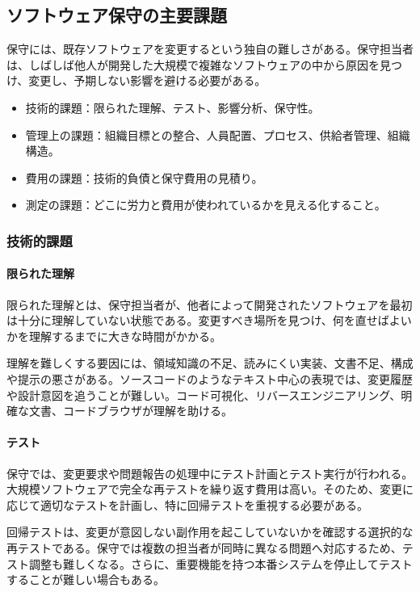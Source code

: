 \documentclass[a4paper,11pt]{ltjsarticle}
\numberwithin{figure}{section}
\numberwithin{table}{section}
\begin{document}
\subsection{ソフトウェア保守の主要課題}
保守には、既存ソフトウェアを変更するという独自の難しさがある。保守担当者は、しばしば他人が開発した大規模で複雑なソフトウェアの中から原因を見つけ、変更し、予期しない影響を避ける必要がある。\par
\begin{itemize}
\item 技術的課題：限られた理解、テスト、影響分析、保守性。
\item 管理上の課題：組織目標との整合、人員配置、プロセス、供給者管理、組織構造。
\item 費用の課題：技術的負債と保守費用の見積り。
\item 測定の課題：どこに労力と費用が使われているかを見える化すること。
\end{itemize}
\subsubsection{技術的課題}
\paragraph{限られた理解}
限られた理解とは、保守担当者が、他者によって開発されたソフトウェアを最初は十分に理解していない状態である。変更すべき場所を見つけ、何を直せばよいかを理解するまでに大きな時間がかかる。\par
理解を難しくする要因には、領域知識の不足、読みにくい実装、文書不足、構成や提示の悪さがある。ソースコードのようなテキスト中心の表現では、変更履歴や設計意図を追うことが難しい。コード可視化、リバースエンジニアリング、明確な文書、コードブラウザが理解を助ける。\par
\paragraph{テスト}
保守では、変更要求や問題報告の処理中にテスト計画とテスト実行が行われる。大規模ソフトウェアで完全な再テストを繰り返す費用は高い。そのため、変更に応じて適切なテストを計画し、特に回帰テストを重視する必要がある。\par
回帰テストは、変更が意図しない副作用を起こしていないかを確認する選択的な再テストである。保守では複数の担当者が同時に異なる問題へ対応するため、テスト調整も難しくなる。さらに、重要機能を持つ本番システムを停止してテストすることが難しい場合もある。\par
\end{document}
